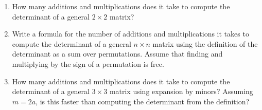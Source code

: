 \begin{enumerate}
\begin{enumerate}
\item  How many additions and multiplications does it take to compute the determinant of a general $2\times 2$ matrix?

\item  Write a formula for the number of additions and multiplications it takes to compute the determinant of a general $n\times n$ matrix using the definition of the determinant as a sum over permutations.  Assume that finding and multiplying by the sign of a permutation is free.

\item How many additions and multiplications does it take to compute the determinant of a general $3\times 3$ matrix using expansion by minors?  Assuming $m=2a$, is this faster than computing the determinant from the definition?
\end{enumerate}


\end{enumerate}

